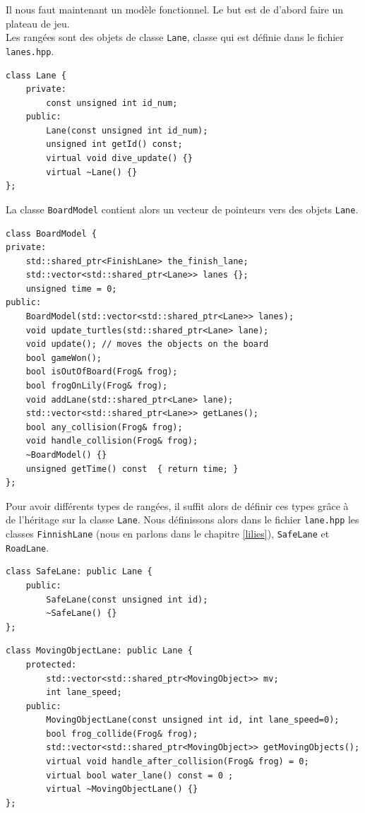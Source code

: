 \documentclass[a4paper, 12pt]{article}
\begin{document}
Il nous faut maintenant un modèle fonctionnel. Le but est de d'abord faire un plateau de jeu. \\

Les rangées sont des objets de classe \texttt{Lane}, classe qui est définie dans le fichier \texttt{lanes.hpp}.

\begin{lstlisting}
class Lane {
    private:
        const unsigned int id_num;
    public:
        Lane(const unsigned int id_num);
        unsigned int getId() const;
        virtual void dive_update() {}
        virtual ~Lane() {}
};  
\end{lstlisting}

La classe \texttt{BoardModel} contient alors un vecteur de pointeurs vers des objets \texttt{Lane}.

\begin{lstlisting}
class BoardModel {
private:
    std::shared_ptr<FinishLane> the_finish_lane;
    std::vector<std::shared_ptr<Lane>> lanes {};
    unsigned time = 0;
public:
    BoardModel(std::vector<std::shared_ptr<Lane>> lanes);
    void update_turtles(std::shared_ptr<Lane> lane);
    void update(); // moves the objects on the board
    bool gameWon();
    bool isOutOfBoard(Frog& frog);
    bool frogOnLily(Frog& frog);
    void addLane(std::shared_ptr<Lane> lane);
    std::vector<std::shared_ptr<Lane>> getLanes();
    bool any_collision(Frog& frog);
    void handle_collision(Frog& frog);
    ~BoardModel() {}
    unsigned getTime() const  { return time; }
};
\end{lstlisting}

Pour avoir différents types de rangées, il suffit alors de définir ces types grâce à de l'héritage sur la classe \texttt{Lane}. Nous définissons alors dans le fichier \texttt{lane.hpp} les classes \texttt{FinnishLane} (nous en parlons dans le chapitre \ref{lilies}), \texttt{SafeLane} et \texttt{RoadLane}. \\

\begin{lstlisting}
class SafeLane: public Lane {
    public:
        SafeLane(const unsigned int id);
        ~SafeLane() {}
};
\end{lstlisting}

\begin{lstlisting}
class MovingObjectLane: public Lane {
    protected:
        std::vector<std::shared_ptr<MovingObject>> mv;
        int lane_speed;
    public:
        MovingObjectLane(const unsigned int id, int lane_speed=0);
        bool frog_collide(Frog& frog);
        std::vector<std::shared_ptr<MovingObject>> getMovingObjects();
        virtual void handle_after_collision(Frog& frog) = 0;
        virtual bool water_lane() const = 0 ;
        virtual ~MovingObjectLane() {}
};
\end{lstlisting}
\end{document}
